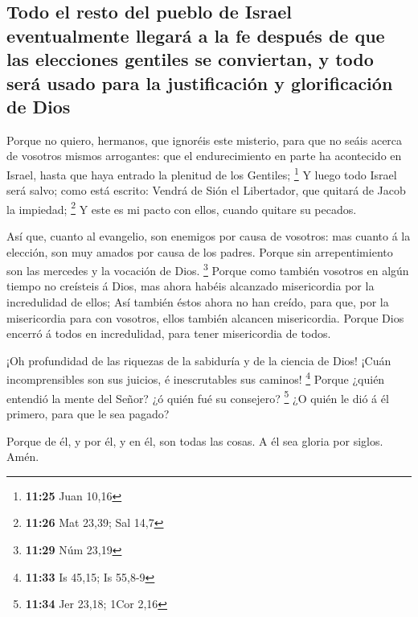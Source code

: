 \hypertarget{todo-el-resto-del-pueblo-de-israel-eventualmente-llegaruxe1-a-la-fe-despuuxe9s-de-que-las-elecciones-gentiles-se-conviertan-y-todo-seruxe1-usado-para-la-justificaciuxf3n-y-glorificaciuxf3n-de-dios}{%
\subsection{Todo el resto del pueblo de Israel eventualmente llegará a
la fe después de que las elecciones gentiles se conviertan, y todo será
usado para la justificación y glorificación de
Dios}\label{todo-el-resto-del-pueblo-de-israel-eventualmente-llegaruxe1-a-la-fe-despuuxe9s-de-que-las-elecciones-gentiles-se-conviertan-y-todo-seruxe1-usado-para-la-justificaciuxf3n-y-glorificaciuxf3n-de-dios}}

 Porque no quiero, hermanos, que ignoréis este misterio,
para que no seáis acerca de vosotros mismos arrogantes: que el
endurecimiento en parte ha acontecido en Israel, hasta que haya entrado
la plenitud de los Gentiles; \footnote{\textbf{11:25} Juan 10,16}
 Y luego todo Israel será salvo; como está escrito: Vendrá
de Sión el Libertador, que quitará de Jacob la impiedad; \footnote{\textbf{11:26}
  Mat 23,39; Sal 14,7}  Y este es mi pacto con ellos,
cuando quitare su pecados.

 Así que, cuanto al evangelio, son enemigos por causa de
vosotros: mas cuanto á la elección, son muy amados por causa de los
padres.  Porque sin arrepentimiento son las mercedes y la
vocación de Dios. \footnote{\textbf{11:29} Núm 23,19} 
Porque como también vosotros en algún tiempo no creísteis á Dios, mas
ahora habéis alcanzado misericordia por la incredulidad de ellos;
 Así también éstos ahora no han creído, para que, por la
misericordia para con vosotros, ellos también alcancen misericordia.
 Porque Dios encerró á todos en incredulidad, para tener
misericordia de todos.

 ¡Oh profundidad de las riquezas de la sabiduría y de la
ciencia de Dios! ¡Cuán incomprensibles son sus juicios, é inescrutables
sus caminos! \footnote{\textbf{11:33} Is 45,15; Is 55,8-9} 
Porque ¿quién entendió la mente del Señor? ¿ó quién fué su consejero?
\footnote{\textbf{11:34} Jer 23,18; 1Cor 2,16}  ¿O quién le
dió á él primero, para que le sea pagado?

 Porque de él, y por él, y en él, son todas las cosas. A él
sea gloria por siglos. Amén.

